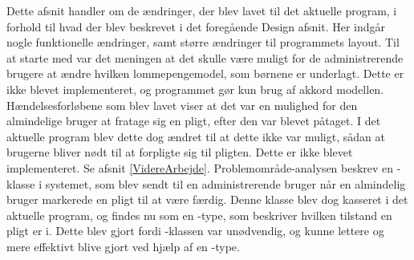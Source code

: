 Dette afsnit handler om de ændringer, der blev lavet til det aktuelle program, i forhold til hvad der blev beskrevet i det foregående Design afsnit. Her indgår nogle funktionelle ændringer, samt større ændringer til programmets layout.
Til at starte med var det meningen at det skulle være muligt for de administrerende brugere at ændre hvilken lommepengemodel, som børnene er underlagt. Dette er ikke blevet implementeret, og programmet gør kun brug af akkord modellen. Hændelsesforløbene som blev lavet viser at det var en mulighed for den almindelige bruger at fratage sig en pligt, efter den var blevet påtaget. I det aktuelle program blev dette dog ændret til at dette ikke var muligt, sådan at brugerne bliver nødt til at forpligte sig til pligten. Dette er ikke blevet implementeret. Se afsnit \ref{VidereArbejde}.
Problemområde-analysen beskrev en -klasse i systemet, som blev sendt til en administrerende bruger når en almindelig bruger markerede en pligt til at være færdig. Denne klasse blev dog kasseret i det aktuelle program, og findes nu som en -type, som beskriver hvilken tilstand en pligt er i. Dette blev gjort fordi -klassen var unødvendig, og kunne lettere og mere effektivt blive gjort ved hjælp af en -type.